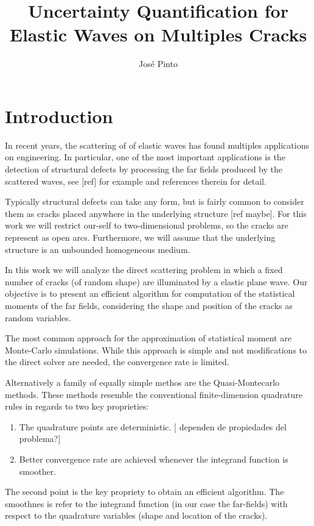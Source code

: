 \documentclass{article}
\title{Uncertainty Quantification for Elastic Waves on Multiples Cracks}
\author{Jos\'e Pinto}
\newcommand{\todo}[1]{{\color{red}[#1]}}
\begin{document}
\maketitle
\section{Introduction}
In recent years, the scattering of of elastic waves has found multiples applications on engineering. 
In particular, one of the most important applications is the detection of structural defects by processing the far fields produced by the scattered waves, see  \todo{ref} for example and references therein for detail.

Typically structural defects can take any form, but is fairly common to consider them as cracks placed anywhere in the underlying structure \todo{ref maybe}. For this work we will restrict our-self to two-dimensional problems, so the cracks are represent as open arcs. Furthermore, we will assume that the underlying structure is an unbounded homogeneous medium. 

In this work we will analyze the direct scattering problem in which a fixed number of cracks (of random shape) are illuminated by a elastic plane wave. Our objective is to present an efficient algorithm for  computation of the statistical moments of the far fields, considering the shape and position of the cracks as random variables. 

The most common approach for the approximation of statistical moment are Monte-Carlo simulations. While this approach is simple and not modifications to the direct solver are needed, the convergence rate is limited. 

Alternatively a family of equally simple methos are the Quasi-Montecarlo methods. These methods resemble the conventional finite-dimension quadrature rules in regards to two key proprieties: 
\begin{enumerate} 
\item 
The quadrature points are deterministic. \todo{ dependen de propiedades del problema?}
\item 
Better convergence rate are achieved whenever the integrand function is smoother.  
\end{enumerate}
The second point is the key propriety to obtain an efficient algorithm. The smoothnes is refer to the integrand function (in our case the far-fields) with respect to the quadrature variables (shape and location of the cracks).
\end{document}
